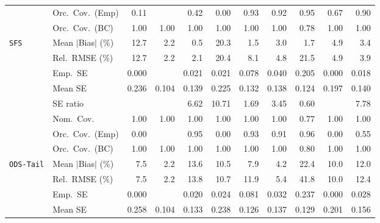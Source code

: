 \begin{landscape}
\begin{longtable}{llrrrrrrrrr}
 & Orc.\ Cov.\ (Emp) & 0.11 &  & 0.42 & 0.00 & \cellcolor{ranktwo}0.93 & \cellcolor{rankthree}0.92 & \cellcolor{rankone}0.95 & 0.67 & 0.90 \\
 & Orc.\ Cov.\ (BC) & \cellcolor{rankone}1.00 & \cellcolor{rankone}1.00 & \cellcolor{rankone}1.00 & \cellcolor{rankone}1.00 & \cellcolor{rankone}1.00 & \cellcolor{rankone}1.00 & \cellcolor{ranktwo}0.78 & \cellcolor{rankone}1.00 & \cellcolor{rankone}1.00 \\
\addlinespace[2pt]
\quad \texttt{SFS} & Mean $|$Bias$|$ (\%) & 12.7 & 2.2 & \cellcolor{rankone}0.5 & 20.3 & \cellcolor{ranktwo}1.5 & 3.0 & \cellcolor{rankthree}1.7 & 4.9 & 3.4 \\
 & Rel.\ RMSE (\%) & 12.7 & \cellcolor{ranktwo}2.2 & \cellcolor{rankone}2.1 & 20.4 & 8.1 & 4.8 & 21.5 & 4.9 & \cellcolor{rankthree}3.9 \\
 & Emp.\ SE & 0.000 &  & 0.021 & 0.021 & 0.078 & 0.040 & 0.205 & 0.000 & 0.018 \\
 & Mean SE & 0.236 & 0.104 & 0.139 & 0.225 & 0.132 & 0.138 & 0.124 & 0.197 & 0.140 \\
 & SE ratio &  &  & 6.62 & 10.71 & \cellcolor{ranktwo}1.69 & \cellcolor{rankthree}3.45 & \cellcolor{rankone}0.60 &  & 7.78 \\
 & Nom.\ Cov. & \cellcolor{rankone}1.00 & \cellcolor{rankone}1.00 & \cellcolor{rankone}1.00 & \cellcolor{rankone}1.00 & \cellcolor{rankone}1.00 & \cellcolor{rankone}1.00 & \cellcolor{ranktwo}0.77 & \cellcolor{rankone}1.00 & \cellcolor{rankone}1.00 \\
 & Orc.\ Cov.\ (Emp) & 0.00 &  & \cellcolor{rankone}0.95 & 0.00 & \cellcolor{rankthree}0.93 & 0.91 & \cellcolor{ranktwo}0.96 & 0.00 & 0.55 \\
 & Orc.\ Cov.\ (BC) & \cellcolor{rankone}1.00 & \cellcolor{rankone}1.00 & \cellcolor{rankone}1.00 & \cellcolor{rankone}1.00 & \cellcolor{rankone}1.00 & \cellcolor{rankone}1.00 & \cellcolor{ranktwo}0.80 & \cellcolor{rankone}1.00 & \cellcolor{rankone}1.00 \\
\addlinespace[2pt]
\quad \texttt{ODS-Tail} & Mean $|$Bias$|$ (\%) & \cellcolor{rankthree}7.5 & \cellcolor{rankone}2.2 & 13.6 & 10.5 & 7.9 & \cellcolor{ranktwo}4.2 & 22.4 & 10.0 & 12.0 \\
 & Rel.\ RMSE (\%) & \cellcolor{rankthree}7.5 & \cellcolor{rankone}2.2 & 13.8 & 10.7 & 11.9 & \cellcolor{ranktwo}5.4 & 41.8 & 10.0 & 12.4 \\
 & Emp.\ SE & 0.000 &  & 0.020 & 0.024 & 0.081 & 0.032 & 0.237 & 0.000 & 0.028 \\
 & Mean SE & 0.258 & 0.104 & 0.133 & 0.238 & 0.126 & 0.137 & 0.129 & 0.201 & 0.156 \\

\end{longtable}
\end{landscape}
